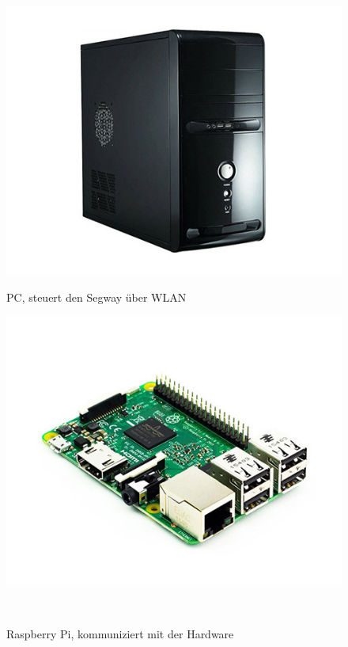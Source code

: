 \documentclass[german,11pt,a4paper]{netforms}
\begin{document}
\begin{figure}[!b]\hfill
{}
  \includegraphics[width=\linewidth]{System-Unit.jpg}
  \caption{PC, steuert den Segway über WLAN}\label{fig:pc}
\endminipage\hfill
{}
  \includegraphics[width=\linewidth]{RaspberryPi3.jpg}
  \caption{Raspberry Pi, kommuniziert mit der Hardware}\label{fig:rpi}
\endminipage\hfill~ \\


\end{figure}
\end{document}
